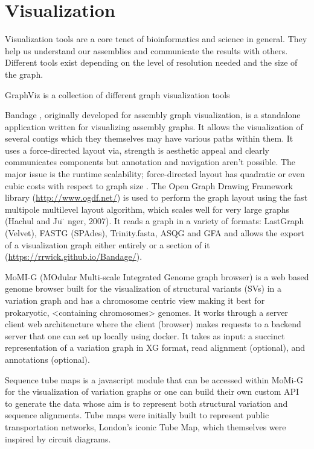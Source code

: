 \documentclass[11pt]{article}
\begin{document}
\section{Visualization}
\label{sec:orge12209e}
Visualization tools are a core tenet of bioinformatics and science in general.
They help us understand our assemblies and communicate the results with others. 
Different tools exist depending on the level of resolution needed and 
the size of the graph. 

GraphViz \cite{northOnlineHierarchicalGraph2002,ellsonGraphvizDynagraphStatic2004}
is a collection of different graph visualization tools 

Bandage \cite{wickBandageInteractiveVisualization2015}, originally developed for 
assembly graph visualization, is a standalone application written for
visualizing assembly graphs.
It allows the visualization of several contigs which they themselves may have
various paths within them.
It uses a force-directed layout via, strength is aesthetic appeal and clearly
communicates components but annotation and navigation aren’t possible.
The major issue is the runtime scalability; force-directed layout has quadratic 
or even cubic costs with respect to graph size .
The Open Graph Drawing Framework library (\url{http://www.ogdf.net/}) is used to
perform the graph layout using the fast multipole multilevel layout algorithm, 
which scales well for very large graphs (Hachul and Ju ̈ nger, 2007).
It reads a graph in a variety of formats: LastGraph (Velvet), FASTG (SPAdes), 
Trinity.fasta, ASQG and GFA and allows the export of a visualization graph
either entirely or a section of it (\url{https://rrwick.github.io/Bandage/}).

MoMI-G \cite{yokoyamaMoMIGModularMultiscale2019}
(MOdular Multi-scale Integrated Genome graph browser) 
is a web based genome browser built for the visualization of structural 
variants (SVs) in a variation graph and has a chromosome centric view making
it best for prokaryotic, <containing chromosomes> genomes. 
It works through a server client web architencture where the client (browser)
makes requests to a backend server that one can set up locally using docker.
It takes as input: a succinct representation of a variation graph in XG format,
read alignment (optional), and annotations (optional).

Sequence tube maps \cite{beyerSequenceTubeMaps2019} is a javascript module that
can be accessed within MoMi-G for the visualization of variation graphs or one
can  build their own custom API to generate the data whose aim is to represent
both structural variation and sequence alignments.
Tube maps were initially built to represent public transportation networks,
London’s iconic Tube Map, \cite{cartwrightamBeckRepresentationLondon2012} which 
themselves were inspired by circuit diagrams.
\end{document}

